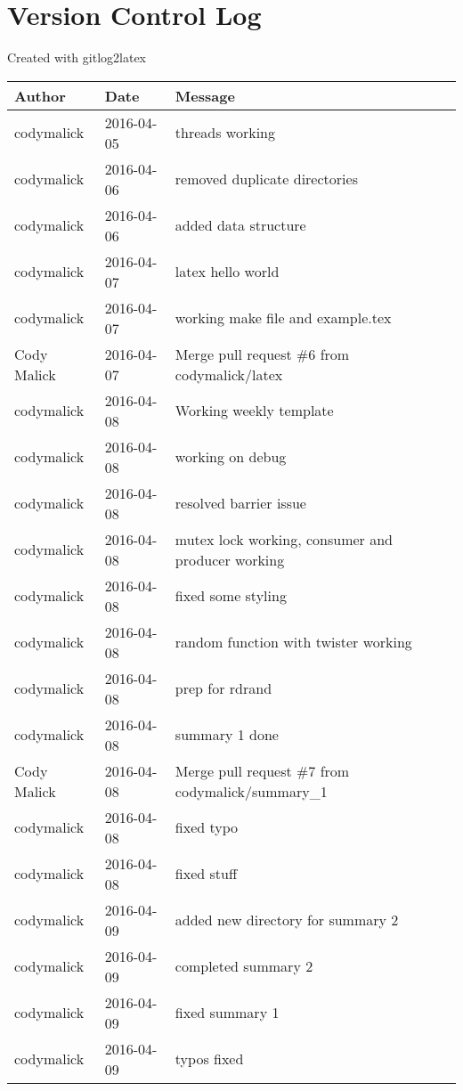 \documentclass[10pt,letterpaper]{article}
\begin{document}
\section{Version Control Log}
Created with gitlog2latex
\begin{center}
\begin{longtabu} to \textwidth {|
    X[4,l]|
    X[3,c]|
    X[8,l]|}
    \hline
    \textbf{Author} & \textbf{Date} & \textbf{Message} \\ \hline
codymalick & 2016-04-05 & threads working \\ \hline
codymalick & 2016-04-06 & removed duplicate directories \\ \hline
codymalick & 2016-04-06 & added data structure \\ \hline
codymalick & 2016-04-07 & latex hello world \\ \hline
codymalick & 2016-04-07 & working make file and example.tex \\ \hline
Cody Malick & 2016-04-07 & Merge pull request \#6 from codymalick/latex \\ \hline
codymalick & 2016-04-08 & Working weekly template \\ \hline
codymalick & 2016-04-08 & working on debug \\ \hline
codymalick & 2016-04-08 & resolved barrier issue \\ \hline
codymalick & 2016-04-08 & mutex lock working, consumer and producer working \\ \hline
codymalick & 2016-04-08 & fixed some styling \\ \hline
codymalick & 2016-04-08 & random function with twister working \\ \hline
codymalick & 2016-04-08 & prep for rdrand \\ \hline
codymalick & 2016-04-08 & summary 1 done \\ \hline
Cody Malick & 2016-04-08 & Merge pull request \#7 from codymalick/summary\_1 \\ \hline
codymalick & 2016-04-08 & fixed typo \\ \hline
codymalick & 2016-04-08 & fixed stuff \\ \hline
codymalick & 2016-04-09 & added new directory for summary 2 \\ \hline
codymalick & 2016-04-09 & completed summary 2 \\ \hline
codymalick & 2016-04-09 & fixed summary 1 \\ \hline
codymalick & 2016-04-09 & typos fixed \\ \hline

\end{longtabu}
\end{center}
\end{document}
